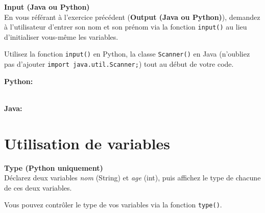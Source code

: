 \begin{Exercice}[5 minutes] \textbf{Input (Java ou Python)}\\
   En vous référant à l'exercice précédent (\textbf{Output (Java ou Python)}), demandez à l'utilisateur d'entrer son nom et son prénom via la fonction \lstinline{input()} au lieu d'initialiser vous-même les variables. \\
   
    \begin{conseil}
       Utilisez la fonction \lstinline{input()} en Python, la classe \lstinline{Scanner()} en Java (n'oubliez pas d'ajouter \lstinline{import java.util.Scanner;}) tout au début de votre code. 
        
    \end{conseil}
    \begin{solution}
    
    \textbf{Python:} 
    
    
    \textbf{\\Java:}
      
       
        
    \end{solution}   
\end{Exercice}

\section{Utilisation de variables}

\begin{Exercice}[3 minutes] \textbf{Type (Python uniquement)}\\
    Déclarez deux variables \textit{nom} (String) et \textit{age} (int), puis affichez le type de chacune de ces deux variables.
    
     \begin{conseil}
        Vous pouvez contrôler le type de vos variables via la fonction \lstinline{type()}.
         
     \end{conseil}
     \begin{solution}
      
     
            
     \end{solution}   
 \end{Exercice}
 
